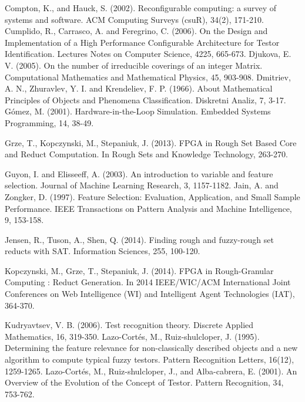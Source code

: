 \documentclass[authoryear,preprint,review,12pt]{elsarticle}
\begin{document}

\begin{thebibliography}{00}

Compton, K., and Hauck, S. (2002). Reconfigurable computing: a survey of systems and software. ACM Computing Surveys (csuR), 34(2), 171-210.
 Cumplido, R., Carrasco, A. and Feregrino, C. (2006). On the Design and Implementation of a High Performance Configurable Architecture for Testor Identification. Lectures Notes on Computer Science, 4225, 665-673.
Djukova, E. V. (2005). On the number of irreducible coverings of an integer Matrix. Computational Mathematics and Mathematical Physics, 45, 903-908.
 Dmitriev, A. N.,  Zhuravlev, Y. I. and Krendeliev, F. P. (1966). About Mathematical Principles of Objects and Phenomena Classification. Diskretni Analiz, 7, 3-17.
G\'omez, M. (2001). Hardware-in-the-Loop Simulation. Embedded Systems Programming, 14, 38-49.

Grze, T., Kopczynski, M., Stepaniuk, J. (2013). FPGA in Rough Set Based Core and Reduct Computation. In Rough Sets and Knowledge Technology, 263-270.

Guyon, I. and Elisseeff, A. (2003). An introduction to variable and feature selection. Journal of Machine Learning Research, 3, 1157-1182.
Jain, A. and Zongker, D. (1997). Feature Selection: Evaluation, Application, and Small Sample Performance. IEEE Transactions on Pattern Analysis and Machine Intelligence, 9, 153-158.

Jensen, R., Tuson, A., Shen, Q. (2014). Finding rough and fuzzy-rough set reducts with SAT. Information Sciences, 255, 100-120.

Kopczynski, M., Grze, T., Stepaniuk, J. (2014). FPGA in Rough-Granular Computing : Reduct Generation. In 2014 IEEE/WIC/ACM International Joint Conferences on Web Intelligence (WI) and Intelligent Agent Technologies (IAT), 364-370. 

Kudryavtsev, V. B. (2006). Test recognition theory. Discrete Applied Mathematics, 16, 319-350.
Lazo-Cort\'es, M., Ruiz-shulcloper, J. (1995). Determining the feature relevance for non-classically described objects and a new algorithm to compute typical fuzzy testors. Pattern Recognition Letters, 16(12), 1259-1265.
Lazo-Cort\'es, M., Ruiz-shulcloper, J., and Alba-cabrera, E. (2001). An Overview of the Evolution of the Concept of Testor. Pattern Recognition, 34, 753-762.


\end{thebibliography}
\end{document}
